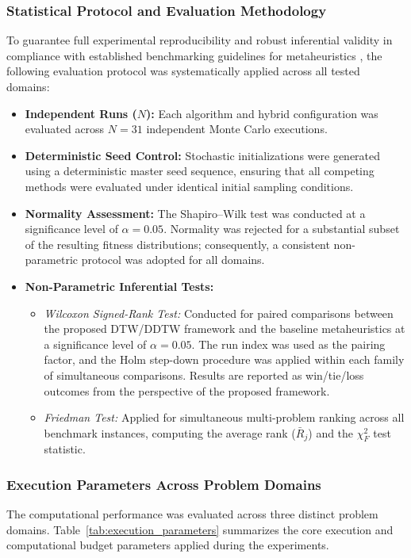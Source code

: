 \documentclass[review]{elsarticle}
\begin{document}
\subsubsection{Statistical Protocol and Evaluation Methodology}
To guarantee full experimental reproducibility and robust inferential validity in compliance with established benchmarking guidelines for metaheuristics \cite{derrac2011practical,carrasco2020recent}, the following evaluation protocol was systematically applied across all tested domains:
\begin{itemize}
    \item \textbf{Independent Runs ($N$):} Each algorithm and hybrid configuration was evaluated across $N = 31$ independent Monte Carlo executions.
    \item \textbf{Deterministic Seed Control:} Stochastic initializations were generated using a deterministic master seed sequence, ensuring that all competing methods were evaluated under identical initial sampling conditions.
    \item \textbf{Normality Assessment:} The Shapiro--Wilk test was conducted at a significance level of $\alpha = 0.05$. Normality was rejected for a substantial subset of the resulting fitness distributions; consequently, a consistent non-parametric protocol was adopted for all domains.
    \item \textbf{Non-Parametric Inferential Tests:}
    \begin{itemize}
        \item \textit{Wilcoxon Signed-Rank Test:} Conducted for paired comparisons between the proposed DTW/DDTW framework and the baseline metaheuristics at a significance level of $\alpha = 0.05$. The run index was used as the pairing factor, and the Holm step-down procedure was applied within each family of simultaneous comparisons. Results are reported as win/tie/loss outcomes from the perspective of the proposed framework.
        \item \textit{Friedman Test:} Applied for simultaneous multi-problem ranking across all benchmark instances, computing the average rank ($\bar{R}_j$) and the $\chi_F^2$ test statistic.
    \end{itemize}
\end{itemize}


\subsubsection{Execution Parameters Across Problem Domains}
The computational performance was evaluated across three distinct problem domains. Table~\ref{tab:execution_parameters} summarizes the core execution and computational budget parameters applied during the experiments.
\end{document}
